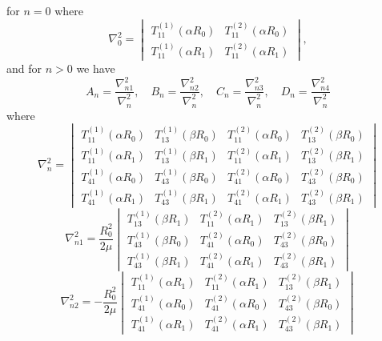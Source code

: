 for $n=0$ where
\begin{equation*}
	\nabla^2_0=\begin{vmatrix}
		T_{11}^{(1)}(\alpha R_0) & T_{11}^{(2)}(\alpha R_0)\\
		T_{11}^{(1)}(\alpha R_1) & T_{11}^{(2)}(\alpha R_1)
	\end{vmatrix},
\end{equation*}
and for $n>0$ we have
\begin{equation*}
	A_n = \frac{\nabla^2_{n1}}{\nabla^2_n},\quad B_n = \frac{\nabla^2_{n2}}{\nabla^2_n},\quad C_n = \frac{\nabla^2_{n3}}{\nabla^2_n},\quad D_n = \frac{\nabla^2_{n4}}{\nabla^2_n}
\end{equation*}
where
\begin{equation}\label{Eq2:DeterminantForSphericalShell}
	\nabla^2_n = \begin{vmatrix}
		T_{11}^{(1)}(\alpha R_0) & T_{13}^{(1)}(\beta R_0) & T_{11}^{(2)}(\alpha R_0) & T_{13}^{(2)}(\beta R_0)\\
		T_{11}^{(1)}(\alpha R_1) & T_{13}^{(1)}(\beta R_1) & T_{11}^{(2)}(\alpha R_1) & T_{13}^{(2)}(\beta R_1)\\
		T_{41}^{(1)}(\alpha R_0) & T_{43}^{(1)}(\beta R_0) & T_{41}^{(2)}(\alpha R_0) & T_{43}^{(2)}(\beta R_0)\\
		T_{41}^{(1)}(\alpha R_1) & T_{43}^{(1)}(\beta R_1) & T_{41}^{(2)}(\alpha R_1) & T_{43}^{(2)}(\beta R_1)
	\end{vmatrix}
\end{equation}
\begin{equation*}
	\nabla^2_{n1} = \frac{R_0^2}{2\mu}\begin{vmatrix}
		T_{13}^{(1)}(\beta R_1) & T_{11}^{(2)}(\alpha R_1) & T_{13}^{(2)}(\beta R_1)\\
		T_{43}^{(1)}(\beta R_0) & T_{41}^{(2)}(\alpha R_0) & T_{43}^{(2)}(\beta R_0)\\
		T_{43}^{(1)}(\beta R_1) & T_{41}^{(2)}(\alpha R_1) & T_{43}^{(2)}(\beta R_1)
	\end{vmatrix}
\end{equation*}
\begin{equation*}
	\nabla^2_{n2} = -\frac{R_0^2}{2\mu}\begin{vmatrix}
		T_{11}^{(1)}(\alpha R_1) & T_{11}^{(2)}(\alpha R_1) & T_{13}^{(2)}(\beta R_1)\\
		T_{41}^{(1)}(\alpha R_0) & T_{41}^{(2)}(\alpha R_0) & T_{43}^{(2)}(\beta R_0)\\
		T_{41}^{(1)}(\alpha R_1) & T_{41}^{(2)}(\alpha R_1) & T_{43}^{(2)}(\beta R_1)
	\end{vmatrix}
\end{equation*}
